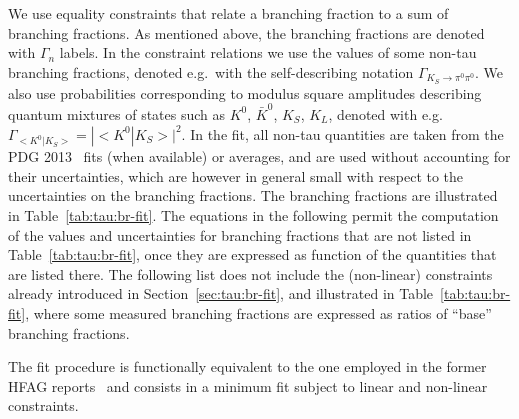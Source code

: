 We use equality constraints that relate a branching fraction to a sum of
branching fractions. As mentioned above, the \mtau branching fractions are
denoted with $\Gamma_n$ labels. In the constraint relations we use the
values of some non-tau branching fractions, denoted e.g.\ with the
self-describing notation $\Gamma_{K_S \to \pi^0\pi^0}$. We also use
probabilities corresponding to modulus square amplitudes describing quantum
mixtures of states such as $K^0$, $\bar{K}^0$, $K_S$, $K_L$, denoted with
e.g.\ $\Gamma_{<K^0|K_S>} = |{<}K^0|K_S{>}|^2$.
In the fit, all non-tau quantities are taken from the PDG 2013~\cite{PDG_2012}
fits (when available) or averages, and are used without accounting for their
uncertainties, which are however in general small with respect
to the uncertainties on the \mtau branching fractions.
The \mtau branching fractions are illustrated in Table~\ref{tab:tau:br-fit}.
The equations in the following permit the computation of the values and
uncertainties for branching fractions that are not listed in
Table~\ref{tab:tau:br-fit}, once they are expressed as function of the
quantities that are listed there. The following list does not include the
(non-linear) constraints already introduced in
Section~\ref{sec:tau:br-fit}, and illustrated in
Table~\ref{tab:tau:br-fit}, where some measured branching fractions are
expressed as ratios of ``base'' branching fractions.

\begin{envsmall}
  \setlength\abovedisplayskip{0pt}
  \setlength\belowdisplayshortskip{0pt}
  \ifhevea\renewcommand{\bar}[1]{\textoverline{#1}}\fi
\end{envsmall}

\label{sec:tau:fit}

The fit procedure is functionally equivalent to the one employed in the
former HFAG reports~\cite{Asner:2010qj,Amhis:2012bh} and consists in a minimum \chisq
fit subject to linear and non-linear constraints.

\label{sec:tau:lifetime}

